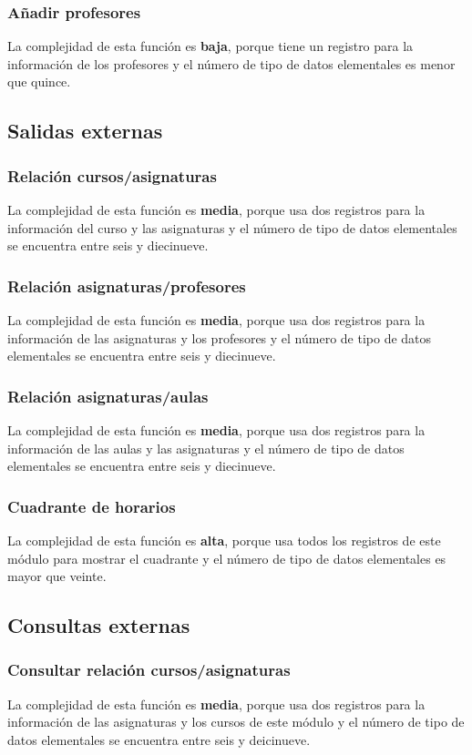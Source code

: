\documentclass[11pt,a4paper,spanish,twoside]{book}
\begin{document}
\subsubsection{Añadir profesores}
La complejidad de esta función es \textbf{baja}, porque tiene un
registro para la información de los profesores y el número de tipo de datos
elementales es menor que quince.

\subsection{Salidas externas}
\subsubsection{Relación cursos/asignaturas}
La complejidad de esta función es \textbf{media}, porque usa dos
registros para la información del curso y las asignaturas y el número de tipo
de datos elementales se encuentra entre seis y diecinueve.
\subsubsection{Relación asignaturas/profesores}
La complejidad de esta función es \textbf{media}, porque usa dos
registros para la información de las asignaturas y los profesores y el número
de tipo de datos elementales se encuentra entre seis y diecinueve. 
\subsubsection{Relación asignaturas/aulas}
La complejidad de esta función es \textbf{media}, porque usa dos
registros para la información de las aulas y las asignaturas y el número de
tipo de datos elementales se encuentra entre seis y diecinueve.
\subsubsection{Cuadrante de horarios}
La complejidad de esta función es \textbf{alta}, porque usa todos los
registros de este módulo para mostrar el cuadrante y el número de
tipo de datos elementales es mayor que veinte.

\subsection{Consultas externas}
\subsubsection{Consultar relación cursos/asignaturas}
La complejidad de esta función es \textbf{media}, porque usa dos
registros para la información de las asignaturas y los cursos de este
módulo y el número de tipo de datos elementales se encuentra entre seis y
deicinueve.
\end{document}
